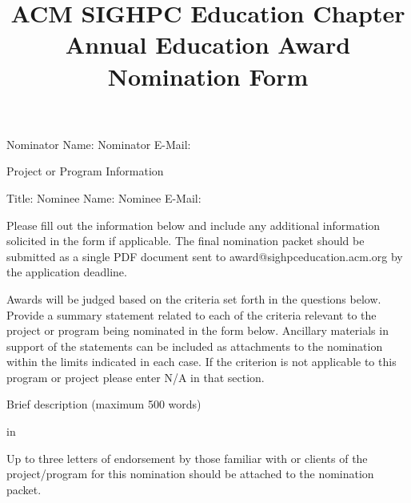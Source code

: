 \documentclass[11pt]{amsart}
\title{ACM SIGHPC Education Chapter Annual Education Award Nomination Form}
\begin{document}
\maketitle

\noindent
Nominator Name:  
\newline Nominator E-Mail:
\newline
\begin{bf} Project or Program Information \end{bf}
\newline
Title: \newline
Nominee Name: \newline
Nominee E-Mail: \newline

Please fill out the information below and include any additional information solicited in the form if applicable.  The final nomination packet should be submitted as a single PDF document sent to award@sighpceducation.acm.org by the application deadline. 
\newline

Awards will be judged based on the criteria set forth in the questions below.  Provide a summary statement related to each of the criteria relevant to the project or program being nominated in the form below.  Ancillary materials in support of the statements can be included as attachments to the nomination within the limits indicated in each case.  If the criterion is not applicable to this program or project please enter N/A in that section.
\newline

\noindent \begin{bf}Brief description (maximum 500 words) \end{bf}
 in










Up to three letters of endorsement by those familiar with or clients of the project/program for this nomination should be attached to the nomination packet.
\newline
\end{document}
